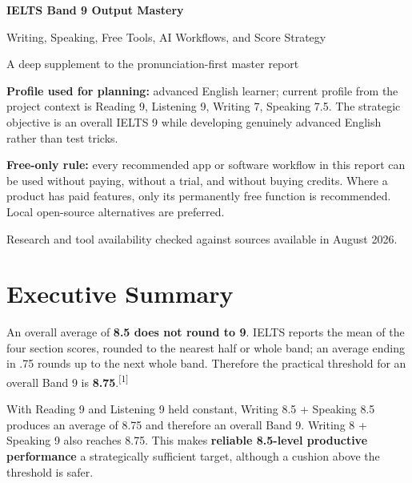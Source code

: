 \documentclass[11pt,a4paper]{article}
\newcommand{\src}[1]{\textsuperscript{[#1]}}
\begin{document}
\begin{titlepage}
\centering
\vspace*{2.2cm}
{\Huge\bfseries\color{navy} IELTS Band 9 Output Mastery\par}
\vspace{0.4cm}
{\LARGE Writing, Speaking, Free Tools, AI Workflows, and Score Strategy\par}
\vspace{0.8cm}
{\large A deep supplement to the pronunciation-first master report\par}
\vfill
\begin{tcolorbox}[width=0.88\textwidth,colback=bluebox,colframe=navy,arc=2mm]
\textbf{Profile used for planning:} advanced English learner; current profile from the project context is Reading 9, Listening 9, Writing 7, Speaking 7.5. The strategic objective is an overall IELTS 9 while developing genuinely advanced English rather than test tricks.
\end{tcolorbox}
\vspace{0.5cm}
\begin{tcolorbox}[width=0.88\textwidth,colback=greenbox,colframe=green!45!black,arc=2mm]
\textbf{Free-only rule:} every recommended app or software workflow in this report can be used without paying, without a trial, and without buying credits. Where a product has paid features, only its permanently free function is recommended. Local open-source alternatives are preferred.
\end{tcolorbox}
\vfill
{\small Research and tool availability checked against sources available in August 2026.}
\end{titlepage}

\tableofcontents
\newpage

\section*{Executive Summary}

\begin{keybox}
An overall average of \textbf{8.5 does not round to 9}. IELTS reports the mean of the four section scores, rounded to the nearest half or whole band; an average ending in .75 rounds up to the next whole band. Therefore the practical threshold for an overall Band 9 is \textbf{8.75}.\src{1}

With Reading 9 and Listening 9 held constant, Writing 8.5 + Speaking 8.5 produces an average of 8.75 and therefore an overall Band 9. Writing 8 + Speaking 9 also reaches 8.75. This makes \textbf{reliable 8.5-level productive performance} a strategically sufficient target, although a cushion above the threshold is safer.
\end{keybox}
\end{document}
